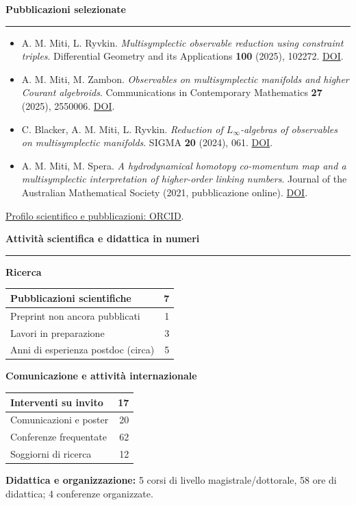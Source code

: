 \documentclass[10pt,a4paper]{article}
\newcommand{\cvsection}[1]{%
    \Needspace{4\baselineskip}%
    \vspace{0.8em}%
    {\large\bfseries\color{accent} #1}\par
    \vspace{0.2em}\hrule\vspace{0.45em}%
}
\begin{document}
\cvsection{Pubblicazioni selezionate}
\begin{itemize}[itemsep=4pt]
    \item A. M. Miti, L. Ryvkin.
    \emph{Multisymplectic observable reduction using constraint triples}.
    Differential Geometry and its Applications \textbf{100} (2025), 102272.
    \href{https://doi.org/10.1016/j.difgeo.2025.102272}{DOI}.
    \item A. M. Miti, M. Zambon.
    \emph{Observables on multisymplectic manifolds and higher Courant algebroids}.
    Communications in Contemporary Mathematics \textbf{27} (2025), 2550006.
    \href{https://doi.org/10.1142/S0219199725500063}{DOI}.
    \item C. Blacker, A. M. Miti, L. Ryvkin.
    \emph{Reduction of $L_\infty$-algebras of observables on multisymplectic manifolds}.
    SIGMA \textbf{20} (2024), 061.
    \href{https://doi.org/10.3842/SIGMA.2024.061}{DOI}.
    \item A. M. Miti, M. Spera.
    \emph{A hydrodynamical homotopy co-momentum map and a multisymplectic interpretation of higher-order linking numbers}.
    Journal of the Australian Mathematical Society (2021, pubblicazione online).
    \href{https://doi.org/10.1017/S1446788720000518}{DOI}.
\end{itemize}
\href{https://orcid.org/0000-0002-8829-1943}{Profilo scientifico e pubblicazioni: ORCID}.\par

\cvsection{Attività scientifica e didattica in numeri}
\begin{minipage}[t]{0.48\textwidth}
\textbf{Ricerca}\par\vspace{3pt}
\begin{tabularx}{\linewidth}{|>{\raggedright\arraybackslash}X|r|}
\hline
Pubblicazioni scientifiche & 7 \\ \hline
Preprint non ancora pubblicati & 1 \\ \hline
Lavori in preparazione & 3 \\ \hline
Anni di esperienza postdoc (circa) & 5 \\ \hline
\end{tabularx}
\end{minipage}\hfill
\begin{minipage}[t]{0.48\textwidth}
\textbf{Comunicazione e attività internazionale}\par\vspace{3pt}
\begin{tabularx}{\linewidth}{|>{\raggedright\arraybackslash}X|r|}
\hline
Interventi su invito & 17 \\ \hline
Comunicazioni e poster & 20 \\ \hline
Conferenze frequentate & 62 \\ \hline
Soggiorni di ricerca & 12 \\ \hline
\end{tabularx}
\end{minipage}
\par\vspace{5pt}
\textbf{Didattica e organizzazione:} 5 corsi di livello magistrale/dottorale, 58 ore di didattica; 4 conferenze organizzate.
\end{document}
